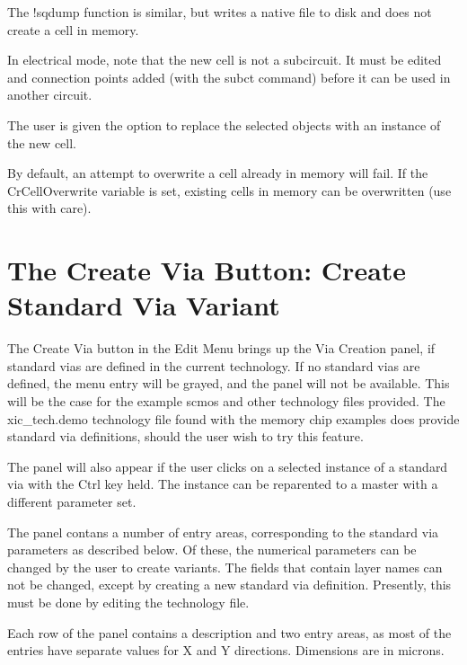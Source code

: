 The {\cb !sqdump} function is similar, but writes a native file to
disk and does not create a cell in memory.

In electrical mode, note that the new cell is not a subcircuit.  It
must be edited and connection points added (with the {\cb subct}
command) before it can be used in another circuit.

The user is given the option to replace the selected objects with
an instance of the new cell.

By default, an attempt to overwrite a cell already in memory will
fail.  If the {\et CrCellOverwrite} variable is set, existing cells in
memory can be overwritten (use this with care). 


\section{The {\cb Create Via} Button: Create Standard Via Variant}

The {\cb Create Via} button in the {\cb Edit Menu} brings up the {\cb
Via Creation} panel, if standard vias are defined in the current
technology.  If no standard vias are defined, the menu entry will be
grayed, and the panel will not be available.  This will be the case
for the example {\vt scmos} and other technology files provided.  The
{\vt xic\_tech.demo} technology file found with the memory chip
examples does provide standard via definitions, should the user wish
to try this feature.

The panel will also appear if the user clicks on a selected instance
of a standard via with the {\kb Ctrl} key held.  The instance can be
reparented to a master with a different parameter set.

The panel contans a number of entry areas, corresponding to the
standard via parameters as described below.  Of these, the numerical
parameters can be changed by the user to create variants.  The fields
that contain layer names can not be changed, except by creating a new
standard via definition.  Presently, this must be done by editing the
technology file.

Each row of the panel contains a description and two entry areas, as
most of the entries have separate values for X and Y directions. 
Dimensions are in microns.


